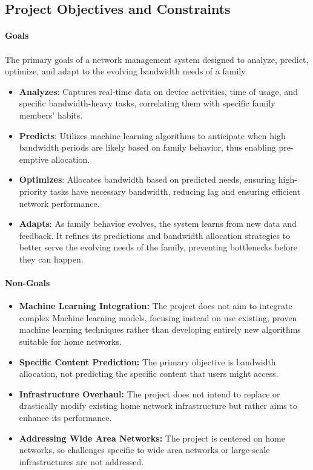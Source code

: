 \documentclass[10pt]{article}
\begin{document}
\subsection{Project Objectives and Constraints}
\paragraph{Goals}
\paragraph{}
The primary goals of a network management system designed to analyze, predict, optimize, and adapt to the evolving bandwidth needs of a family.

\begin{itemize}
  \item \textbf{Analyzes}: Captures real-time data on device activities, time of usage, and specific bandwidth-heavy tasks, correlating them with specific family members’ habits.
  \item \textbf{Predicts}: Utilizes machine learning algorithms to anticipate when high bandwidth periods are likely based on family behavior, thus enabling pre-emptive allocation.
  \item \textbf{Optimizes}: Allocates bandwidth based on predicted needs, ensuring high-priority tasks have necessary bandwidth, reducing lag and ensuring efficient network performance.
  \item \textbf{Adapts}: As family behavior evolves, the system learns from new data and feedback. It refines its predictions and bandwidth allocation strategies to better serve the evolving needs of the family, preventing bottlenecks before they can happen.
\end{itemize}

\paragraph{Non-Goals}
\begin{itemize}
    \item \textbf{Machine Learning Integration:} The project does not aim to integrate complex Machine learning models, focusing instead on use existing, proven machine learning techniques rather than developing entirely new algorithms suitable for home networks.
    
    \item \textbf{Specific Content Prediction:} The primary objective is bandwidth allocation, not predicting the specific content that users might access.
    
    \item \textbf{Infrastructure Overhaul:} The project does not intend to replace or drastically modify existing home network infrastructure but rather aims to enhance its performance.
    
    \item \textbf{Addressing Wide Area Networks:} The project is centered on home networks, so challenges specific to wide area networks or large-scale infrastructures are not addressed.
\end{itemize}
\end{document}
